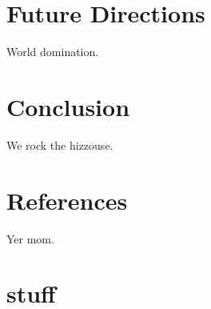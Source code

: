 \documentclass{acmconf}
\begin{document}
\section{Future Directions}

World domination.

\section{Conclusion}

We rock the hizzouse.

\section{References}

Yer mom.

\section{stuff}
\end{document}
